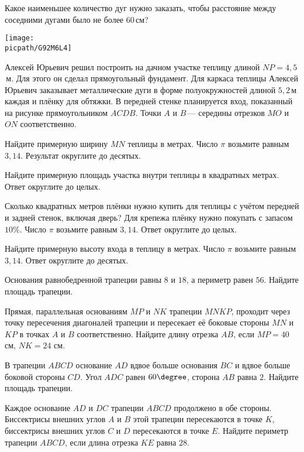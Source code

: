 \begin{class}[number=4]
	\begin{listofex}
		\item Какое наименьшее количество дуг нужно заказать, чтобы расстояние между соседними дугами было не более \( 60 \) см?
		\begin{center}
			\texttt{[image: \\picpath/G92M6L4]}
		\end{center}
		Алексей Юрьевич решил построить на дачном участке теплицу длиной \( NP=4,5 \) м. Для этого он сделал прямоугольный фундамент. Для каркаса теплицы Алексей Юрьевич заказывает металлические дуги в форме полуокружностей длиной \( 5,2 \) м каждая и плёнку для обтяжки. В передней стенке планируется вход, показанный на рисунке прямоугольником \( ACDB \). Точки \( A \) и \( B \) --- середины отрезков \( MO \) и \( ON \) соответственно.
		\item Найдите примерную ширину \( MN \) теплицы в метрах. Число \( \pi  \) возьмите равным \( 3,14 \). Результат округлите до десятых.
		\item Найдите примерную площадь участка внутри теплицы в квадратных метрах. Ответ округлите до целых.
		\item Сколько квадратных метров плёнки нужно купить для теплицы с учётом передней и задней стенок, включая дверь? Для крепежа плёнку нужно покупать с запасом \( 10\% \). Число \( \pi \) возьмите равным \( 3,14 \). Ответ округлите до целых.
		\item Найдите примерную высоту входа в теплицу в метрах. Число \( \pi \) возьмите равным \( 3,14 \). Ответ округлите до десятых.
		\item Основания равнобедренной трапеции равны \( 8 \) и \( 18 \), а периметр равен \( 56 \). Найдите площадь трапеции.
		\item Прямая, параллельная основаниям \( MP \) и \( NK \) трапеции \( MNKP \), проходит через точку пересечения диагоналей трапеции и пересекает её боковые стороны \( MN \) и \( KP \) в точках  \( A \) и \( B \) соответственно. Найдите длину отрезка \( AB \), если \( MP=40 \) см, \( NK=24 \) см.
		\item В трапеции \( ABCD \) основание \( AD \) вдвое больше основания \( BC \) и вдвое больше боковой стороны \( CD \). Угол \( ADC \) равен \( 60\degree \), сторона \( AB \) равна \( 2 \). Найдите площадь трапеции.
		\item Каждое основание \( AD \) и \( DC \) трапеции \( ABCD \) продолжено в обе стороны. Биссектрисы внешних углов \( A \) и \( B \) этой трапеции пересекаются в точке \( K \), биссектрисы внешних углов \( C \) и \( D \) пересекаются в точке \( E \). Найдите периметр трапеции \( ABCD \), если длина отрезка \( KE \) равна \( 28 \).

\end{listofex}
\end{class}
